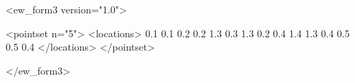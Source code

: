 
\begin{DoxyVerbInclude}
<ew_form3 version="1.0">

<pointset n="5">
<locations>
0.1 0.1 0.2
0.2 1.3 0.3
1.3 0.2 0.4
1.4 1.3 0.4
0.5 0.5 0.4
</locations>
</pointset>

</ew_form3>
\end{DoxyVerbInclude}
 